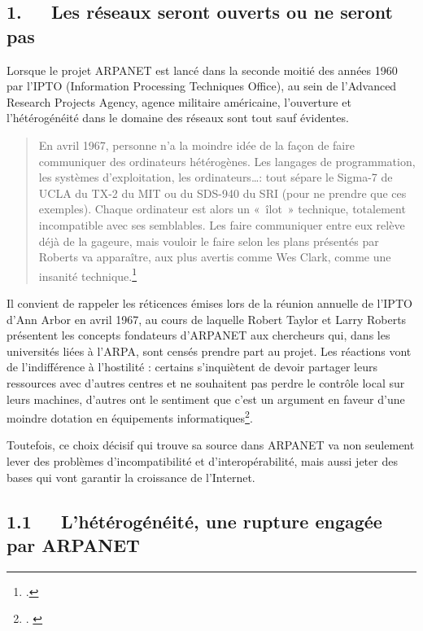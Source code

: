 \documentclass{FramateX}
\begin{document}
\begin{refsection}
\section*{1.~~~Les réseaux seront ouverts ou ne seront pas}
{}


Lorsque le projet ARPANET est lancé dans la seconde moitié des années
1960 par l'IPTO (Information Processing Techniques Office), au sein de
l'Advanced Research Projects Agency, agence
militaire américaine, l'ouverture et
l'hétérogénéité dans le domaine des réseaux sont tout
sauf évidentes.

\begin{quote}
En avril 1967, personne n'a la moindre idée de la
façon de faire communiquer des ordinateurs hétérogènes. Les langages de
programmation, les systèmes d'exploitation, les
ordinateurs\ldots : tout sépare le Sigma-7 de UCLA du TX-2 du MIT ou du
SDS-940 du SRI (pour ne prendre que ces exemples). Chaque ordinateur
est alors un «~îlot~» technique, totalement incompatible avec ses
semblables. Les faire communiquer entre eux relève déjà de la gageure,
mais vouloir le faire selon les plans présentés par Roberts va
apparaître, aux plus avertis comme Wes Clark, comme une insanité
technique.\footnote{\cite[p.~415]{serresaux2000}.}
\end{quote}

Il convient de rappeler les réticences émises lors de la réunion
annuelle de l'IPTO d'Ann Arbor en
avril 1967, au cours de laquelle Robert Taylor et Larry Roberts
présentent les concepts fondateurs d'ARPANET aux
chercheurs qui, dans les universités liées à l'ARPA,
sont censés prendre part au projet. Les réactions vont de
l'indifférence à l'hostilité :
certains s'inquiètent de devoir partager leurs
ressources avec d'autres centres et ne souhaitent pas
perdre le contrôle local sur leurs machines, d'autres
ont le sentiment que c'est un argument en faveur
d'une moindre dotation en équipements
informatiques\footnote{\cite[pp.~411-413]{serresaux2000}.  \cite[p.~50]{abbateinventing1999}}. 

Toutefois, ce choix décisif qui trouve sa source dans ARPANET va non
seulement lever des problèmes d'incompatibilité et
d'interopérabilité, mais aussi jeter des bases qui
vont garantir la croissance de l'Internet. 

\subsection*{1.1~~~L'hétérogénéité, une rupture engagée par ARPANET}
{}


\end{refsection}
\end{document}
